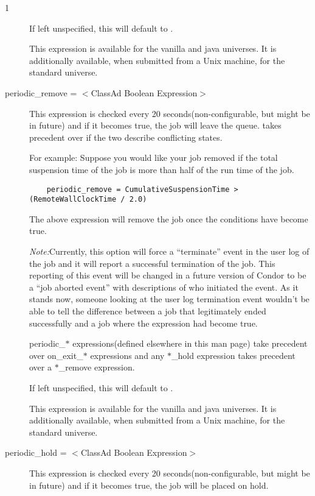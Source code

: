 \begin{ManPage}{\label{man-condor-submit}}{1}
\begin{description}
If left unspecified, this will default to .

This expression is available for the vanilla and java universes.
It is additionally available, when submitted from a Unix machine,
for the standard universe.


\item[periodic\_remove = $<$ClassAd Boolean Expression$>$]
This expression is checked every 20 seconds(non-configurable,
but might be in future) and if it becomes true, the job will
leave the queue.  takes precedent over
 if the two describe conflicting states.

For example:
Suppose you would like your job removed if the total suspension time of the
job is more than half of the run time of the job.

\begin{verbatim}
	periodic_remove = CumulativeSuspensionTime > (RemoteWallClockTime / 2.0)
\end{verbatim}

The above expression will remove the job once the conditions have become true.

\emph{Note:}Currently, this option will force a ``terminate'' event in the user
log of the job and it will report a successful termination of the job. This
reporting of this event will be changed in a future version of Condor to
be a ``job aborted event'' with descriptions of who initiated the event. As
it stands now, someone looking at the user log termination event wouldn't be
able to tell the difference between a job that legitimately ended successfully
and a job where the  expression had become true. 

periodic\_$*$ expressions(defined elsewhere in this man page) take
precedent over on\_exit\_$*$ expressions and any $*$\_hold expression takes
precedent over a $*$\_remove expression.

If left unspecified, this will default to .

This expression is available for the vanilla and java universes.
It is additionally available, when submitted from a Unix machine,
for the standard universe.


\item[periodic\_hold = $<$ClassAd Boolean Expression$>$] This expression
is checked every 20 seconds(non-configurable, but might be in future) and
if it becomes true, the job will be placed on hold.


\end{description}
\end{ManPage}
